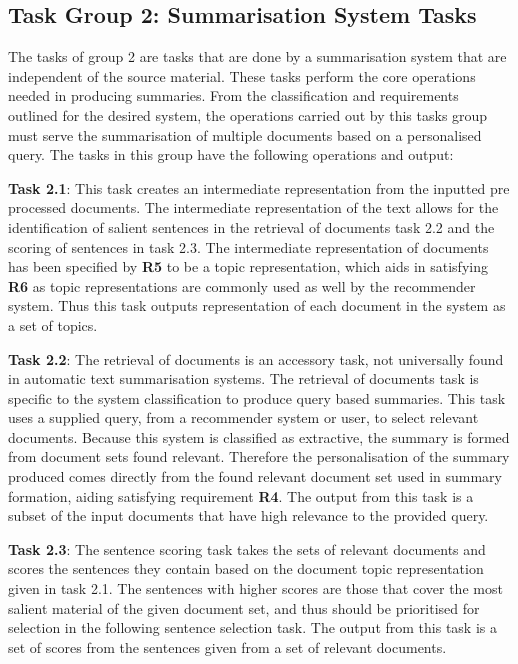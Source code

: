 \subsection{Task Group 2: Summarisation System Tasks}
The tasks of group 2 are tasks that are done by a summarisation system that are  independent of the source material. These tasks perform the core operations needed in producing summaries. From the classification and requirements outlined for the desired system, the operations carried out by this tasks group must serve the summarisation of multiple documents based on a personalised query. The tasks in this group have the following operations and output:

\textbf{Task 2.1}: This task creates an intermediate representation from the inputted pre processed documents. The intermediate representation of the text allows for the identification of salient sentences in the retrieval of documents task 2.2 and the scoring of sentences in task 2.3. The intermediate representation of documents has been specified by \textbf{R5} to be a topic representation, which aids in satisfying \textbf{R6} as topic representations are commonly used as well by the recommender system. Thus this task outputs representation of each document in the system as a set of topics.

\textbf{Task 2.2}: The retrieval of documents is an accessory task, not universally found in automatic text summarisation systems. The retrieval of documents task is specific to the system classification to produce query based summaries. This task uses a supplied query, from a recommender system or user, to select relevant documents. Because this system is classified as extractive, the summary is formed from document sets found relevant. Therefore the personalisation of the summary produced comes directly from the found relevant document set used in summary formation, aiding satisfying requirement \textbf{R4}. The output from this task is a subset of the input documents that have high relevance to the provided query.

\textbf{Task 2.3}: The sentence scoring task takes the sets of relevant documents and scores the sentences they contain based on the document topic representation given in task 2.1. The sentences with higher scores are those that cover the most salient material of the given document set, and thus should be prioritised for selection in the following sentence selection task. The output from this task is a set of scores from the sentences given from a set of relevant documents.

